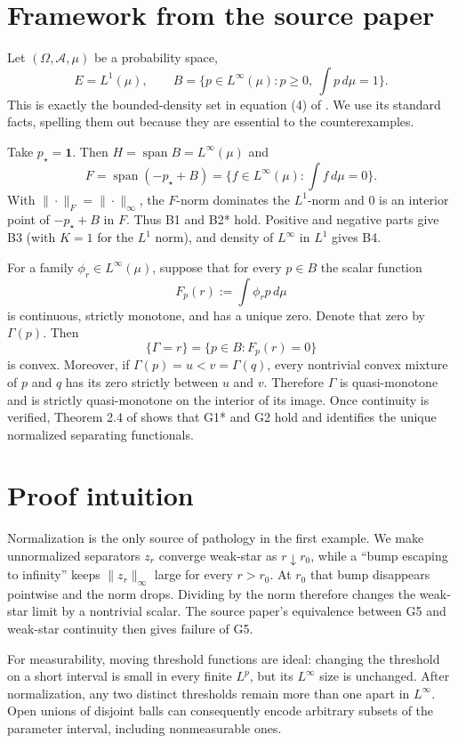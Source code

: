 \documentclass[11pt]{article}
\newcommand{\1}{\mathbf 1}
\begin{document}
\section{Framework from the source paper}

Let $(\Omega,\mathcal A,\mu)$ be a probability space,
\[
 E=L^1(\mu),\qquad
 B=\{p\in L^\infty(\mu):p\geq0,\ \textstyle\int p\,d\mu=1\}.
\]
This is exactly the bounded-density set in equation (4) of
\cite{Steinwart2015}.  We use its standard facts, spelling them out because
they are essential to the counterexamples.

Take $p_\star=\1$.  Then $H=\operatorname{span}B=L^\infty(\mu)$ and
\[
 F=\operatorname{span}(-p_\star+B)
   =\{f\in L^\infty(\mu):\textstyle\int f\,d\mu=0\}.
\]
With $\|\cdot\|_F=\|\cdot\|_\infty$, the $F$-norm dominates the $L^1$-norm
and $0$ is an interior point of $-p_\star+B$ in $F$.  Thus B1 and B2* hold.
Positive and negative parts give B3 (with $K=1$ for the $L^1$ norm), and
density of $L^\infty$ in $L^1$ gives B4.

For a family $\phi_r\in L^\infty(\mu)$, suppose that for every $p\in B$ the
scalar function
\[
 F_p(r):=\int \phi_r p\,d\mu
\]
is continuous, strictly monotone, and has a unique zero.  Denote that zero by
$\Gamma(p)$.  Then
\[
 \{\Gamma=r\}=\{p\in B:F_p(r)=0\}
\]
is convex.  Moreover, if $\Gamma(p)=u<v=\Gamma(q)$, every nontrivial convex
mixture of $p$ and $q$ has its zero strictly between $u$ and $v$.  Therefore
$\Gamma$ is quasi-monotone and is strictly quasi-monotone on the interior of
its image.  Once continuity is verified, Theorem 2.4 of
\cite{Steinwart2015} shows that G1* and G2 hold and identifies the unique
normalized separating functionals.

\section{Proof intuition}

Normalization is the only source of pathology in the first example.  We make
unnormalized separators $z_r$ converge weak-star as $r\downarrow r_0$, while a
``bump escaping to infinity'' keeps $\|z_r\|_\infty$ large for every $r>r_0$.
At $r_0$ that bump disappears pointwise and the norm drops.  Dividing by the
norm therefore changes the weak-star limit by a nontrivial scalar.  The source
paper's equivalence between G5 and weak-star continuity then gives failure of
G5.

For measurability, moving threshold functions are ideal: changing the threshold
on a short interval is small in every finite $L^p$, but its $L^\infty$ size is
unchanged.  After normalization, any two distinct thresholds remain more than
one apart in $L^\infty$.  Open unions of disjoint balls can consequently encode
arbitrary subsets of the parameter interval, including nonmeasurable ones.
\end{document}
